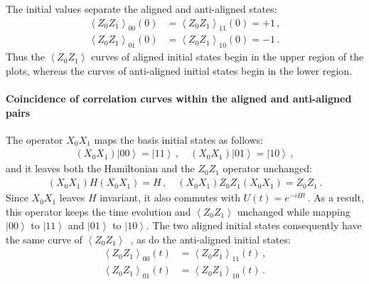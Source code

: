 \documentclass[11pt]{article}
\numberwithin{equation}{section}
\newcommand{\ket}[1]{\left| #1 \right\rangle} %
\newcommand{\ev}[1]{\left\langle #1 \right\rangle} %
\begin{document}
The initial values separate the aligned and anti-aligned states:
\begin{align*}
  \ev{Z_0Z_1}_{00}(0) &= \ev{Z_0Z_1}_{11}(0) = +1 \,,\\
  \ev{Z_0Z_1}_{01}(0) &= \ev{Z_0Z_1}_{10}(0) = -1 \,.
\end{align*}
Thus the $\ev{Z_0Z_1}$ curves of aligned initial states begin in the upper region of the plots, whereas the curves of anti-aligned initial states begin in the lower region.

\paragraph{Coincidence of correlation curves within the aligned and anti-aligned pairs}
The operator $X_0X_1$ maps the basis initial states as follows:
\begin{align*}
  (X_0X_1)\ket{00} = \ket{11} \,, \quad (X_0X_1)\ket{01} = \ket{10} \,,
\end{align*}
and it leaves both the Hamiltonian and the $Z_0Z_1$ operator unchanged:
\begin{align*}
  (X_0X_1)H(X_0X_1) = H \,, \quad
  (X_0X_1)Z_0Z_1(X_0X_1) = Z_0Z_1 \,.
\end{align*}
Since $X_0X_1$ leaves $H$ invariant, it also commutes with $U(t) = e^{-iHt}$\,. As a result, this operator keeps the time evolution and $\ev{Z_0Z_1}$ unchanged while mapping $\ket{00}$ to $\ket{11}$ and $\ket{01}$ to $\ket{10}$. The two aligned initial states consequently have the same curve of $\ev{Z_0Z_1}$ \,, as do the anti-aligned initial states:
\begin{subequations}
    \begin{align}
    \ev{Z_0Z_1}_{00}(t) &= \ev{Z_0Z_1}_{11}(t) \,, \label{aligned_ev eq.}\\
    \ev{Z_0Z_1}_{01}(t) &= \ev{Z_0Z_1}_{10}(t) \,. \label{anti_aligned_ev eq.}
    \end{align}
\end{subequations}
\end{document}
